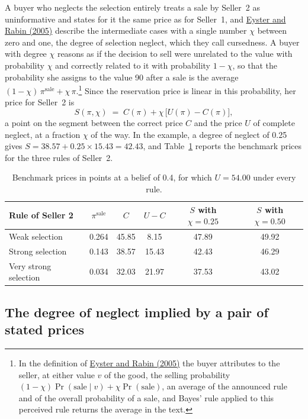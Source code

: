 \documentclass[11pt,a4paper]{article}
\newcommand{\cy}[2]{\hyperlink{cite.#1}{\textcolor{citecolor}{#2}}}
\newcommand{\psale}{\pi^{\mathrm{sale}}}
\newcommand{\sale}{\mathrm{sale}}
\begin{document}
A buyer who neglects the selection entirely treats a sale by Seller~2 as uninformative and states for it the same price as for Seller~1, and \cy{eysterrabin}{Eyster and Rabin (2005)} describe the intermediate cases with a single number $\chi$ between zero and one, the degree of selection neglect, which they call cursedness. A buyer with degree $\chi$ reasons as if the decision to sell were unrelated to the value with probability $\chi$ and correctly related to it with probability $1-\chi$, so that the probability she assigns to the value 90 after a sale is the average $(1-\chi)\,\psale+\chi\,\pi$.\footnote{In the definition of \cy{eysterrabin}{Eyster and Rabin (2005)} the buyer attributes to the seller, at either value $v$ of the good, the selling probability $(1-\chi)\Pr(\sale\mid v)+\chi\Pr(\sale)$, an average of the announced rule and of the overall probability of a sale, and Bayes' rule applied to this perceived rule returns the average in the text.} Since the reservation price is linear in this probability, her price for Seller~2 is
\[
S(\pi,\chi)\;=\;C(\pi)+\chi\,\bigl[U(\pi)-C(\pi)\bigr],
\]
a point on the segment between the correct price $C$ and the price $U$ of complete neglect, at a fraction $\chi$ of the way. In the example, a degree of neglect of 0.25 gives $S=38.57+0.25\times 15.43=42.43$, and Table~\ref{tab:benchmarks} reports the benchmark prices for the three rules of Seller~2.

\begin{table}[H]
\centering
\begin{tabular}{@{}lccccc@{}}
\toprule
Rule of Seller 2 & $\psale$ & $C$ & $U-C$ & $S$ with $\chi=0.25$ & $S$ with $\chi=0.50$\\
\midrule
Weak selection & 0.264 & 45.85 & 8.15 & 47.89 & 49.92\\
Strong selection & 0.143 & 38.57 & 15.43 & 42.43 & 46.29\\
Very strong selection & 0.034 & 32.03 & 21.97 & 37.53 & 43.02\\
\bottomrule
\end{tabular}
\caption{Benchmark prices in points at a belief of 0.4, for which $U=54.00$ under every rule.}
\label{tab:benchmarks}
\end{table}

\subsection{The degree of neglect implied by a pair of stated prices}
\end{document}
